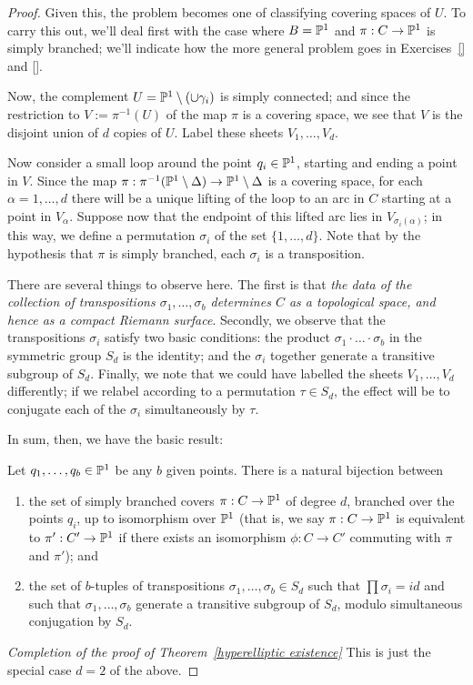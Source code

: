 \begin{proof}
   Given this, the problem becomes one of classifying covering spaces of $U$. To carry this out, we'll deal first with the case where  $B = \PP^1$ and $\pi : C \to \PP^1$ is simply branched; we'll indicate how the more general problem goes in Exercises~\ref{} and \ref{}.
   
%   
   
   Now, the complement $U = \PP^1 \setminus (\cup \gamma_i)$ is simply connected; and since the restriction to $V := \pi^{-1}(U)$ of the map $\pi$ is a covering space, we see that $V$ is the disjoint union of $d$ copies of $U$. Label these sheets $V_1, \dots, V_d$.
   
   Now consider a small loop around the point $q_i \in \PP^1$, starting and ending a point in $V$. Since the map $\pi : \pi^{-1}(\PP^1 \setminus \Delta) \to \PP^1 \setminus \Delta$ is a covering space, for each $\alpha = 1, \dots, d$ there will be a unique lifting of the loop to an arc in $C$ starting at a point in $V_\alpha$. Suppose now that the endpoint of this lifted arc lies in $V_{\sigma_i(\alpha)}$; in this way, we define a permutation $\sigma_i$ of the set $\{1,\dots,d\}$. Note that by the hypothesis that $\pi$ is simply branched, each $\sigma_i$ is a transposition.
   
   There are several things to observe here. The first is that \emph{the data of the collection of transpositions $\sigma_1, \dots, \sigma_b$ determines $C$ as a topological space, and hence as a compact Riemann surface}. Secondly, we observe that the transpositions $\sigma_i$ satisfy two basic conditions: the product $\sigma_1\cdot \dots \cdot \sigma_b$ in the symmetric group $S_d$ is the identity; and the $\sigma_i$ together generate a transitive subgroup of $S_d$. Finally, we note that we could have labelled the sheets $V_1, \dots,V_d$ differently; if we relabel according to a permutation $\tau \in S_d$, the effect will be to conjugate each of the $\sigma_i$ simultaneously by $\tau$.
   
   In sum, then, we have the basic result:
   
   \begin{lemma}
   Let $q_1,\dots, q_b \in \PP^1$ be any $b$ given points. There is a natural bijection between 
   \begin{enumerate}
   \item the set of  simply branched covers $\pi : C \to \PP^1$ of degree $d$, branched over the points $q_i$, up to isomorphism over $\PP^1$ (that is, we say $\pi : C \to \PP^1$ is equivalent to $\pi' : C' \to \PP^1$ if there exists an isomorphism $\phi : C \to C'$ commuting with $\pi$ and $\pi'$); and 
   \item the set of $b$-tuples of transpositions $\sigma_1, \dots, \sigma_b \in S_d$ such that $\prod \sigma_i = id$ and such that $\sigma_1, \dots, \sigma_b$ generate a transitive subgroup of $S_d$, modulo simultaneous conjugation by $S_d$.
   \end{enumerate}
   \end{lemma}


\emph{Completion of the proof of Theorem~\ref{hyperelliptic existence}}
This is just the special case $d=2$ of the above.
\end{proof}


